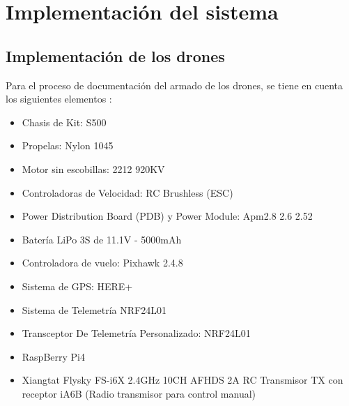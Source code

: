 \chapter{Implementación del sistema}
%
\section{Implementación de los drones}
Para el proceso de documentación del armado de los drones, se tiene en cuenta los siguientes elementos : 
\begin{itemize}[itemsep=0pt,parsep=0pt,topsep=0pt,partopsep=0pt]
  \item Chasis de Kit: S500
  \item Propelas: Nylon 1045
  \item Motor sin escobillas: 2212 920KV
  \item Controladoras de Velocidad: RC Brushless (ESC)
  \item Power Distribution Board (PDB) y Power Module: Apm2.8 2.6 2.52
  \item Batería LiPo 3S de 11.1V - 5000mAh
  \item Controladora de vuelo: Pixhawk 2.4.8
  \item Sistema de GPS: HERE+
  \item Sistema de Telemetría NRF24L01
  \item Transceptor De Telemetría Personalizado: NRF24L01
  \item RaspBerry Pi4
  \item Xiangtat Flysky FS-i6X 2.4GHz 10CH AFHDS 2A RC Transmisor TX con receptor iA6B (Radio transmisor para control manual)
\end{itemize}


